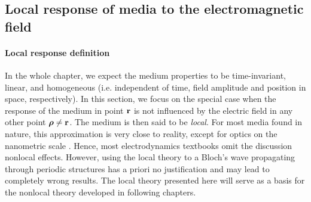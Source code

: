 \subsection{Local response of media to the electromagnetic field} \label{loc_response_of_media}
\paragraph{Local response definition} \label{subsection_local_resp} %
In the whole chapter, we expect the medium properties to be time-invariant, linear, and homogeneous (i.e. independent of time, field amplitude and position in space, respectively). 
In this section, we focus on the special case when the response of the medium in point ${\mathbf{r}}$ is not influenced by the electric field in any other point $\boldsymbol{\rho} \neq {\mathbf{r}}$. The medium is then said to be \textit{local}. 
For most media found in nature, this approximation is very close to reality, except for optics on the nanometric scale \cite{wubs2013nonlocal}. Hence, most electrodynamics textbooks omit the discussion nonlocal effects. However, using the local theory to a Bloch's wave propagating through periodic structures has a priori no justification and may lead to completely wrong results. The local theory presented here will serve as a basis for the nonlocal theory developed in following chapters.

